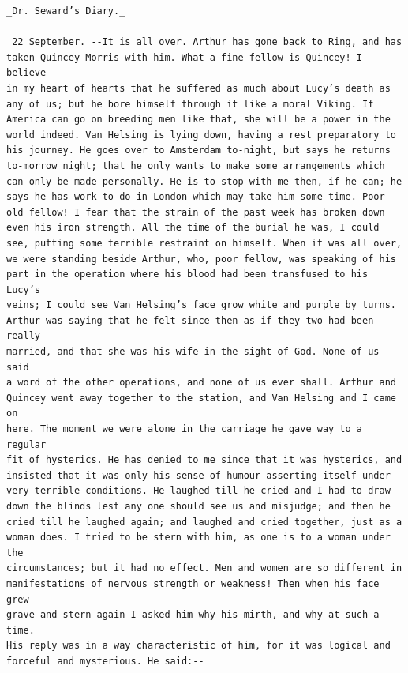 \documentclass{article}
\begin{document}
\begin{verbatim}
_Dr. Seward’s Diary._

_22 September._--It is all over. Arthur has gone back to Ring, and has
taken Quincey Morris with him. What a fine fellow is Quincey! I believe
in my heart of hearts that he suffered as much about Lucy’s death as
any of us; but he bore himself through it like a moral Viking. If
America can go on breeding men like that, she will be a power in the
world indeed. Van Helsing is lying down, having a rest preparatory to
his journey. He goes over to Amsterdam to-night, but says he returns
to-morrow night; that he only wants to make some arrangements which
can only be made personally. He is to stop with me then, if he can; he
says he has work to do in London which may take him some time. Poor
old fellow! I fear that the strain of the past week has broken down
even his iron strength. All the time of the burial he was, I could
see, putting some terrible restraint on himself. When it was all over,
we were standing beside Arthur, who, poor fellow, was speaking of his
part in the operation where his blood had been transfused to his Lucy’s
veins; I could see Van Helsing’s face grow white and purple by turns.
Arthur was saying that he felt since then as if they two had been really
married, and that she was his wife in the sight of God. None of us said
a word of the other operations, and none of us ever shall. Arthur and
Quincey went away together to the station, and Van Helsing and I came on
here. The moment we were alone in the carriage he gave way to a regular
fit of hysterics. He has denied to me since that it was hysterics, and
insisted that it was only his sense of humour asserting itself under
very terrible conditions. He laughed till he cried and I had to draw
down the blinds lest any one should see us and misjudge; and then he
cried till he laughed again; and laughed and cried together, just as a
woman does. I tried to be stern with him, as one is to a woman under the
circumstances; but it had no effect. Men and women are so different in
manifestations of nervous strength or weakness! Then when his face grew
grave and stern again I asked him why his mirth, and why at such a time.
His reply was in a way characteristic of him, for it was logical and
forceful and mysterious. He said:--


\end{verbatim}
\end{document}
